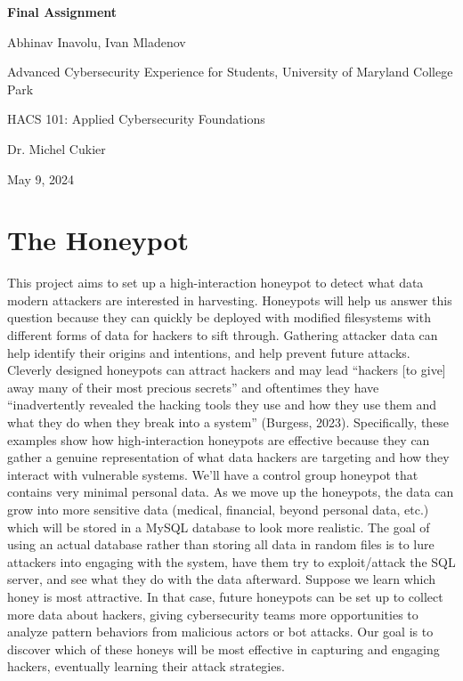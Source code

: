 \documentclass[12pt]{article}
\begin{document}
\doublespacing
\setlength{\abovedisplayskip}{-10pt}
\setlength{\belowdisplayskip}{-10pt}
\setlength{\abovedisplayshortskip}{0pt}
\setlength{\belowdisplayshortskip}{0pt}

\vspace*{\fill}
\begin{center}
\textbf{Final Assignment}
\end{center}
\quad
\begin{center} Abhinav Inavolu, Ivan Mladenov \end{center}
\begin{center} Advanced Cybersecurity Experience for Students, University of Maryland College Park \end{center}
\begin{center} HACS 101: Applied Cybersecurity Foundations \end{center}
\begin{center} Dr. Michel Cukier \end{center}
\begin{center} May 9, 2024 \end{center}
\vfill %


\section*{\normalsize{The Honeypot}}
This project aims to set up a high-interaction honeypot to detect what data modern attackers are interested in harvesting. Honeypots will help us answer this question because they can quickly be deployed with modified filesystems with different forms of data for hackers to sift through. Gathering attacker data can help identify their origins and intentions, and help prevent future attacks.  Cleverly designed honeypots can attract hackers and may lead “hackers [to give] away many of their most precious secrets” and oftentimes they have “inadvertently revealed the hacking tools they use and how they use them and what they do when they break into a system” (Burgess, 2023). Specifically, these examples show how high-interaction honeypots are effective because they can gather a genuine representation of what data hackers are targeting and how they interact with vulnerable systems. \newline
\indent We’ll have a control group honeypot that contains very minimal personal data. As we move up the honeypots, the data can grow into more sensitive data (medical, financial, beyond personal data, etc.) which will be stored in a MySQL database to look more realistic. The goal of using an actual database rather than storing all data in random files is to lure attackers into engaging with the system, have them try to exploit/attack the SQL server, and see what they do with the data afterward. \newline
\indent Suppose we learn which honey is most attractive. In that case, future honeypots can be set up to collect more data about hackers, giving cybersecurity teams more opportunities to analyze pattern behaviors from malicious actors or bot attacks. Our goal is to discover which of these honeys will be most effective in capturing and engaging hackers, eventually learning their attack strategies. 
\end{document}
